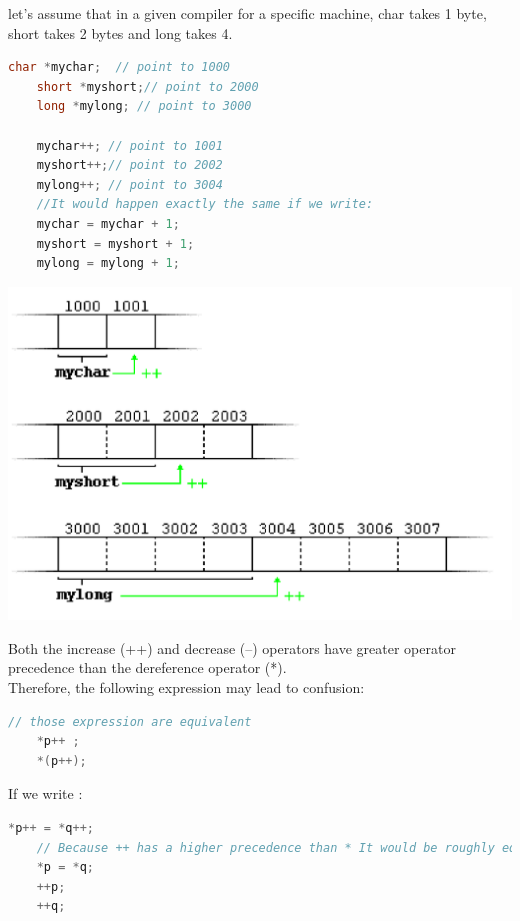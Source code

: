 \documentclass[12pt,oneside]{book}
\begin{document}
let's assume that in a given compiler for a specific machine, char takes 1 byte, short takes 2 bytes and long takes 4.
	\begin{lstlisting}[language=C++]
    char *mychar;  // point to 1000
    short *myshort;// point to 2000
    long *mylong; // point to 3000

    mychar++; // point to 1001 
    myshort++;// point to 2002 
    mylong++; // point to 3004
    //It would happen exactly the same if we write:
    mychar = mychar + 1; 
    myshort = myshort + 1;
    mylong = mylong + 1; 
\end{lstlisting}
\begin{center}
	\includegraphics[width=0.5\linewidth]{../pic/3316/33.png}
\end{center}

Both the increase (++) and decrease (--) operators have greater operator precedence than the dereference operator (*). \\
Therefore, the following expression may lead to confusion:
\begin{lstlisting}[language=C++]
    // those expression are equivalent
    *p++ ;
    *(p++);
\end{lstlisting}

If we write :
\begin{lstlisting}[language=C++]
    *p++ = *q++;
    // Because ++ has a higher precedence than * It would be roughly equivalent to: 
    *p = *q;
    ++p; 
    ++q; 
\end{lstlisting}
\end{document}
